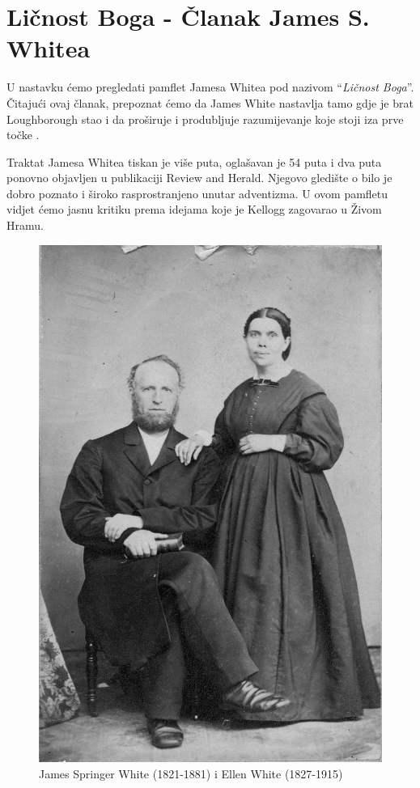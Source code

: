 \chapter{Ličnost Boga - Članak James S. Whitea}

U nastavku ćemo pregledati pamflet Jamesa Whitea pod nazivom “\textit{Ličnost Boga}”. Čitajući ovaj članak, prepoznat ćemo da James White nastavlja tamo gdje je brat Loughborough stao i da proširuje i produbljuje razumijevanje koje stoji iza prve točke .

Traktat Jamesa Whitea tiskan je više puta, oglašavan je 54 puta i dva puta ponovno objavljen u publikaciji Review and Herald. Njegovo gledište o  bilo je dobro poznato i široko rasprostranjeno unutar adventizma. U ovom pamfletu vidjet ćemo jasnu kritiku prema idejama koje je Kellogg zagovarao u Živom Hramu.

\begin{figure}[hp]
    \centering
    \includegraphics[width=1\linewidth]{images/james-and-ellen-white.jpg}
    \caption*{James Springer White (1821-1881) i Ellen White (1827-1915)}
    \label{fig:james-and-ellen-white}
\end{figure}

